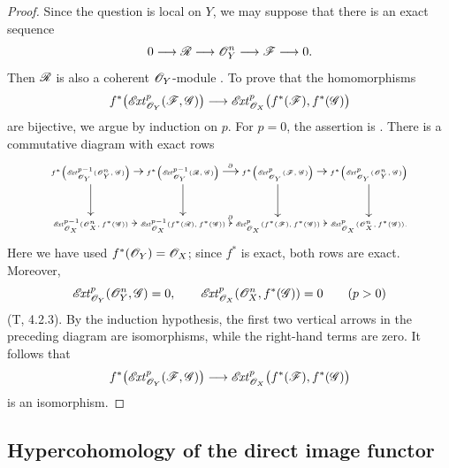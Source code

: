 \begin{proof}
Since the question is local on $Y$, we may suppose that there is an
exact sequence
\[
  0\longrightarrow\mathscr{R}\longrightarrow\mathscr{O}_Y^n
  \longrightarrow\mathscr{F}\longrightarrow0.
\]
Then $\mathscr{R}$ is also a coherent $\mathscr{O}_Y$-module
.
To prove that the homomorphisms
\[
  f^*\bigl(\mathscr{E}\!\mathit{xt}^p_{\mathscr{O}_Y}(\mathscr{F},\mathscr{G})\bigr)
  \longrightarrow
  \mathscr{E}\!\mathit{xt}^p_{\mathscr{O}_X}
    \bigl(f^*(\mathscr{F}),f^*(\mathscr{G})\bigr)
\]
are bijective, we argue by induction on $p$.
For $p=0$, the assertion is
.
There is a commutative diagram with exact rows
\[
{\tiny
  \xymatrix@C=2pt@R=24pt{
  f^*\!\left(\shExt^{p-1}_{\sh{O}_Y}(\sh{O}_Y^n,\sh{G})\right)
    \ar[r]\ar[d]
  & f^*\!\left(\shExt^{p-1}_{\sh{O}_Y}(\sh{R},\sh{G})\right)
    \ar[r]^\partial\ar[d]
  & f^*\!\left(\shExt^p_{\sh{O}_Y}(\sh{F},\sh{G})\right)
    \ar[r]\ar[d]
  & f^*\!\left(\shExt^p_{\sh{O}_Y}(\sh{O}_Y^n,\sh{G})\right)
    \ar[d]\\
  \shExt^{p-1}_{\sh{O}_X}(\sh{O}_X^n,f^*(\sh{G}))
    \ar[r]
  & \shExt^{p-1}_{\sh{O}_X}(f^*(\sh{R}),f^*(\sh{G}))
    \ar[r]^\partial
  & \shExt^p_{\sh{O}_X}(f^*(\sh{F}),f^*(\sh{G}))
    \ar[r]
  & \shExt^p_{\sh{O}_X}(\sh{O}_X^n,f^*(\sh{G})).
  }}
\]
Here we have used $f^*(\mathscr{O}_Y)=\mathscr{O}_X$; since $f^*$ is exact,
both rows are exact.
Moreover,
\[
  \mathscr{E}\!\mathit{xt}^p_{\mathscr{O}_Y}(\mathscr{O}_Y^n,\mathscr{G})=0,
  \qquad
  \mathscr{E}\!\mathit{xt}^p_{\mathscr{O}_X}(\mathscr{O}_X^n,f^*(\mathscr{G}))=0
  \qquad(p>0)
\]
(T, 4.2.3).
By the induction hypothesis, the first two vertical arrows in the
preceding diagram are isomorphisms, while the right-hand terms are
zero.  It follows that
\[
  f^*\bigl(\mathscr{E}\!\mathit{xt}^p_{\mathscr{O}_Y}(\mathscr{F},\mathscr{G})\bigr)
  \longrightarrow
  \mathscr{E}\!\mathit{xt}^p_{\mathscr{O}_X}
    \bigl(f^*(\mathscr{F}),f^*(\mathscr{G})\bigr)
\]
is an isomorphism.
\end{proof}

\subsection{Hypercohomology of the direct image functor}
\label{subsection:0.12.4}

